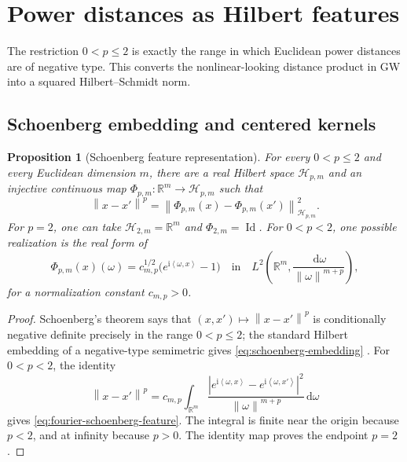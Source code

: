 \documentclass[11pt,a4paper]{article}
\newtheorem{proposition}[theorem]{Proposition}
\theoremstyle{definition}
\theoremstyle{remark}
\newcommand{\R}{\mathbb R}
\newcommand{\Hcal}{\mathcal H}
\newcommand{\Id}{\operatorname{Id}}
\newcommand{\dd}{\,\mathrm d}
\newcommand{\norm}[1]{\left\lVert #1\right\rVert}
\newcommand{\abs}[1]{\left\lvert #1\right\rvert}
\newcommand{\ip}[2]{\left\langle #1,#2\right\rangle}
\begin{document}
\section{Power distances as Hilbert features}
\label{sec:hilbert-features}

The restriction \(0<p\leq2\) is exactly the range in which Euclidean power
distances are of negative type.  This converts the nonlinear-looking
distance product in GW into a squared Hilbert--Schmidt norm.

\subsection{Schoenberg embedding and centered kernels}

\begin{proposition}[Schoenberg feature representation]
\label{prop:schoenberg-feature}
For every \(0<p\leq2\) and every Euclidean dimension \(m\), there are a real
Hilbert space \(\Hcal_{p,m}\) and an injective continuous map
\(\Phi_{p,m}:\R^m\to\Hcal_{p,m}\) such that
\begin{equation}
  \norm{x-x'}^p
  =\norm{\Phi_{p,m}(x)-\Phi_{p,m}(x')}^2_{\Hcal_{p,m}}.
  \label{eq:schoenberg-embedding}
\end{equation}
For \(p=2\), one can take \(\Hcal_{2,m}=\R^m\) and
\(\Phi_{2,m}=\Id\).  For \(0<p<2\), one possible realization is the real
form of
\begin{equation}
  \Phi_{p,m}(x)(\omega)
  =c_{m,p}^{1/2}\bigl(e^{\mathrm i\ip{\omega}{x}}-1\bigr)
  \quad\text{in}\quad
  L^2\!\left(\R^m,\frac{\dd\omega}{\norm{\omega}^{m+p}}\right),
  \label{eq:fourier-schoenberg-feature}
\end{equation}
for a normalization constant \(c_{m,p}>0\).
\end{proposition}

\begin{proof}
Schoenberg's theorem says that \((x,x')\mapsto\norm{x-x'}^p\) is
conditionally negative definite precisely in the range \(0<p\leq2\); the
standard Hilbert embedding of a negative-type semimetric gives
\eqref{eq:schoenberg-embedding} \citep{Schoenberg1938}.  For \(0<p<2\), the
identity
\[
  \norm{x-x'}^p
  =c_{m,p}\int_{\R^m}
  \frac{\abs{e^{\mathrm i\ip{\omega}{x}}
             -e^{\mathrm i\ip{\omega}{x'}}}^2}
       {\norm{\omega}^{m+p}}\dd\omega
\]
gives \eqref{eq:fourier-schoenberg-feature}.  The integral is finite near
the origin because \(p<2\), and at infinity because \(p>0\).  The identity
map proves the endpoint \(p=2\).
\end{proof}
\end{document}
